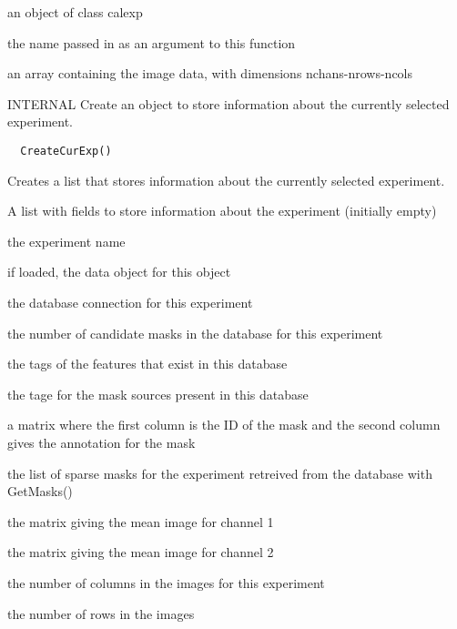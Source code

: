 \documentclass[a4paper]{book}
\begin{document}
%
\begin{Value}
an object of class calexp \begin{ldescription}
\item[\code{name}] the name passed in
as an argument to this function\item[\code{data}] an array
containing the image data, with dimensions
nchans-nrows-ncols
\end{ldescription}
\end{Value}
%
\begin{Description}\relax
INTERNAL Create an object to store information about the
currently selected experiment.
\end{Description}
%
\begin{Usage}
\begin{verbatim}
  CreateCurExp()
\end{verbatim}
\end{Usage}
%
\begin{Details}\relax
Creates a list that stores information about the
currently selected experiment.
\end{Details}
%
\begin{Value}
A list with fields to store information about the
experiment (initially empty) \begin{ldescription}
\item[\code{name}] the experiment
name\item[\code{data}] if loaded, the data object for this
object\item[\code{db}] the database connection for this
experiment\item[\code{nmasks}] the number of candidate masks
in the database for this experiment\item[\code{features}] the
tags of the features that exist in this database
\item[\code{sources}] the tage for the mask sources present in
this database\item[\code{selmat}] a matrix where the first
column is the ID of the mask and the second column gives
the annotation for the mask\item[\code{sms}] the list of
sparse masks for the experiment retreived from the
database with GetMasks()\item[\code{mimg1}] the matrix giving
the mean image for channel 1\item[\code{mimg2}] the matrix
giving the mean image for channel 2\item[\code{nx}] the number
of columns in the images for this experiment
\item[\code{ny}] the number of rows in the images
\end{ldescription}
\end{Value}
\end{document}
